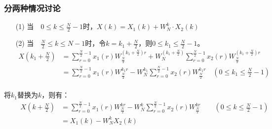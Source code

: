 \documentclass[notheorems,compress,mathserif,table]{beamer}
\begin{document}
\begin{frame}[shrink]\frametitle{分两种情况讨论}  %
\begin{enumerate}
\item [(1)]当$\quad 0\leq k\leq \frac{N}{2}-1$时，$X(k)=X_{1}(k) + W_{N}^{k}\cdot X_{2}(k)$\newline 
\item [(2)]当$\quad \frac{N}{2}\leq k\leq N-1$时，令$k=k_{1}+\frac{N}{2}$，则$0\leq k_{1}\leq \frac{N}{2}-1$。
\begin{equation*}
\begin{split}
X(k_{1}+\frac{N}{2})
&=\sum_{r=0}^{\frac{N}{2}-1}x_{1}(r)W_{\frac{N}{2}}^{(k_{1}+\frac{N}{2})r} +W_{N}^{(k_{1}+\frac{N}{2})}\sum_{r=0}^{\frac{N}{2}-1}x_{2}(r)W_{\frac{N}{2}}^{(k_{1}+\frac{N}{2})r}\\
&=\sum_{r=0}^{\frac{N}{2}-1}x_{1}(r)W_{\frac{N}{2}}^{k_{1}r} -W_{N}^{k_{1}}\sum_{r=0}^{\frac{N}{2}-1}x_{2}(r)W_{\frac{N}{2}}^{k_{1}r}\quad(0\leq k_1\leq \frac{N}{2}-1)\\
\end{split}
\end{equation*}
\end{enumerate}
\quad\quad 将$k_{1}$替换为$k$，则有：
\begin{equation*}
\begin{split}
\qquad   X(k+\frac{N}{2}) &=\sum_{r=0}^{\frac{N}{2}-1}x_{1}(r)W_{\frac{N}{2}}^{kr} -W_{N}^{k}\sum_{r=0}^{\frac{N}{2}-1}x_{2}(r)W_{\frac{N}{2}}^{kr}
                                 \quad\quad(0\leq k\leq \frac{N}{2}-1) \\
                               &=X_{1}(k) - W_{N}^{k}X_{2}(k)
\end{split}
\end{equation*}
\end{frame}
\end{document}
